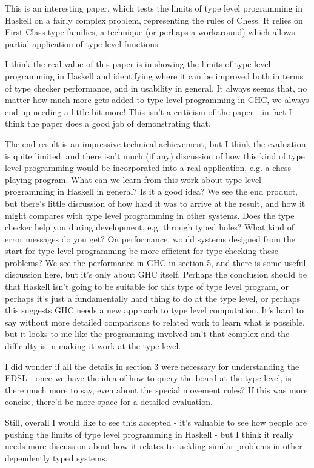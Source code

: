 This is an interesting paper, which tests the limits of type level programming in Haskell on a fairly complex problem, representing the rules of Chess. It relies on First Class type families, a technique (or perhaps a workaround) which allows partial application of type level functions.

I think the real value of this paper is in showing the limits of type level programming in Haskell and identifying where it can be improved both in terms of type checker performance, and in usability in general. It always seems that, no matter how much more gets added to type level programming in GHC, we always end up needing a little bit more! This isn't a criticism of the paper - in fact I think the paper does a good job of demonstrating that.

The end result is an impressive technical achievement, but I think the evaluation is quite limited, and there isn't much (if any) discussion of how this kind of type level programming would be incorporated into a real application, e.g. a chess playing program. What can we learn from this work about type level programming in Haskell in general? Is it a good idea? We see the end product, but there's little discussion of how hard it was to arrive at the result, and how it might compares with type level programming in other systems. Does the type checker help you during development, e.g. through typed holes? What kind of error messages do you get? On performance, would systems designed from the start for type level programming be more efficient for type checking these problems? We see the performance in GHC in section 5, and there is some useful discussion here, but it's only about GHC itself. Perhaps the conclusion should be that Haskell isn't going to be suitable for this type of type level program, or perhaps it's just a fundamentally hard thing to do at the type level, or perhaps this suggests GHC needs a new approach to type level computation. It's hard to say without more detailed comparisons to related work to learn what is possible, but it looks to me like the programming involved isn't that complex and the difficulty is in making it work at the type level.

I did wonder if all the details in section 3 were necessary for understanding the EDSL - once we have the idea of how to query the board at the type level, is there much more to say, even about the special movement rules? If this was more concise, there'd be more space for a detailed evaluation.

Still, overall I would like to see this accepted - it's valuable to see how people are pushing the limits of type level programming in Haskell - but I think it really needs more discussion about how it relates to tackling similar problems in other dependently typed systems.

